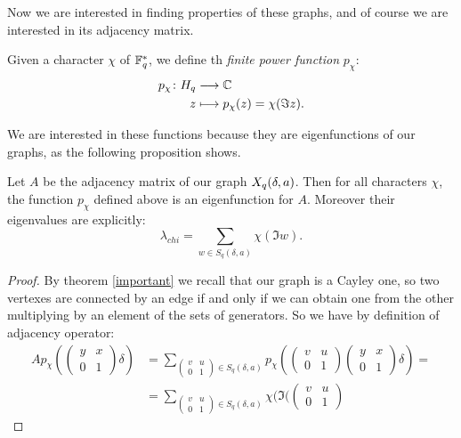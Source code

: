 Now we are interested in finding properties of these graphs, and of course we are interested in its adjacency matrix.
\begin{defn}
	Given a character $\chi$ of ${\mathbb F}_q^{*}$, we define th \emph{finite power function} $p_{\chi}$:
	\begin{align*}
		p_{\chi} \colon H_q & \longrightarrow {\mathbb C} \\
		z & \longmapsto p_{\chi}(z)=\chi (\Im z).
	\end{align*}
\end{defn}
We are interested in these functions because they are eigenfunctions of our graphs, as the following proposition shows.
\begin{prop}
Let $A$ be the adjacency matrix of our graph $X_q (\delta ,a)$. Then for all characters $\chi$, the function $p_{\chi}$
defined above is an eigenfunction for $A$. Moreover their eigenvalues are explicitly:
\begin{equation}\label{eigen}
	\lambda_{chi}=\sum_{w\in S_q(\delta,a)} \chi (\Im w).
\end{equation}
\begin{proof}
By theorem \ref{important} we recall that our graph is a Cayley one, so two vertexes are connected by an edge if and only if
we can obtain one from the other multiplying by an element of the sets of generators.
So we have by definition of adjacency operator:
\begin{align*}
	Ap_{\chi}(\begin{pmatrix} y & x \\ 0 & 1 \end{pmatrix} \delta) &=
	 \sum_{\begin{pmatrix} v & u \\ 0 & 1 \end{pmatrix} \in S_q(\delta,a)} p_{\chi}(\begin{pmatrix} v & u \\ 0 & 1 \end{pmatrix}
	 \begin{pmatrix} y & x \\ 0 & 1 \end{pmatrix} \delta)=\\
	 &=\sum_{\begin{pmatrix} v & u \\ 0 & 1 \end{pmatrix} \in S_q(\delta,a)} \chi (\Im (\begin{pmatrix} v & u \\ 0 & 1 \end{pmatrix}

\end{align*}
\end{proof}
\end{prop}
